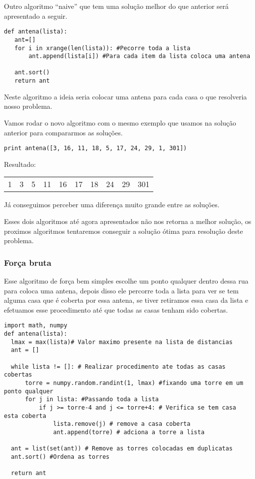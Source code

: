 \documentclass[11pt]{article}
\begin{document}
Outro algoritmo ``naive'' que tem uma solução melhor do que anterior será apresentado a seguir.

\begin{verbatim}
def antena(lista):
   ant=[]
   for i in xrange(len(lista)): #Pecorre toda a lista
       ant.append(lista[i]) #Para cada item da lista coloca uma antena

   ant.sort()
   return ant
\end{verbatim}

Neste algoritmo a ideia seria colocar uma antena para cada casa o que
resolveria nosso problema.

Vamos rodar o novo algoritmo com o mesmo exemplo que usamos na solução
anterior para compararmos as soluções.

\begin{verbatim}
print antena([3, 16, 11, 18, 5, 17, 24, 29, 1, 301])
\end{verbatim}

Resultado:
\begin{center}
\begin{tabular}{rrrrrrrrrr}
1 & 3 & 5 & 11 & 16 & 17 & 18 & 24 & 29 & 301\\
\end{tabular}
\end{center}

Já conseguimos perceber uma diferença muito grande entre as soluções.

Esses dois algoritmos até agora apresentados não nos retorna a melhor
solução, os proximos algoritmos tentaremos conseguir a solução ótima
para resolução deste problema.

\subsubsection{Força bruta}
\label{sec-5-3-2}
\label{sec-3-2}

Esse algoritmo de força bem simples escolhe um ponto qualquer dentro
dessa rua para coloca uma antena, depois disso ele percorre toda a
lista para ver se tem alguma casa que é coberta por essa antena, se
tiver retiramos essa casa da lista e efetuamos esse procedimento até
que todas as casas tenham sido cobertas.


\begin{verbatim}
import math, numpy
def antena(lista):
  lmax = max(lista)# Valor maximo presente na lista de distancias
  ant = []

  while lista != []: # Realizar procedimento ate todas as casas cobertas
      torre = numpy.random.randint(1, lmax) #fixando uma torre em um ponto qualquer
      for j in lista: #Passando toda a lista
          if j >= torre-4 and j <= torre+4: # Verifica se tem casa esta coberta
              lista.remove(j) # remove a casa coberta
              ant.append(torre) # adciona a torre a lista

  ant = list(set(ant)) # Remove as torres colocadas em duplicatas
  ant.sort() #Ordena as torres

  return ant
\end{verbatim}
\end{document}
